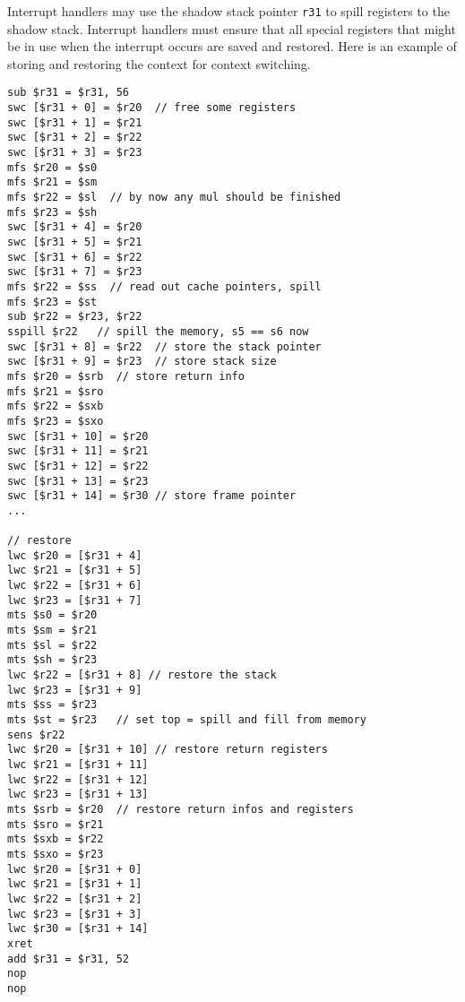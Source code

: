 Interrupt handlers may use the shadow stack pointer \texttt{r31} to spill registers
to the shadow stack. Interrupt handlers must ensure that all special registers
that might be in use when the interrupt occurs %
are saved and restored.
%
Here is an example of storing and restoring the context for context switching.
\begin{verbatim}
sub $r31 = $r31, 56
swc [$r31 + 0] = $r20  // free some registers
swc [$r31 + 1] = $r21
swc [$r31 + 2] = $r22
swc [$r31 + 3] = $r23
mfs $r20 = $s0
mfs $r21 = $sm
mfs $r22 = $sl  // by now any mul should be finished
mfs $r23 = $sh
swc [$r31 + 4] = $r20
swc [$r31 + 5] = $r21
swc [$r31 + 6] = $r22
swc [$r31 + 7] = $r23
mfs $r22 = $ss  // read out cache pointers, spill
mfs $r23 = $st
sub $r22 = $r23, $r22
sspill $r22   // spill the memory, s5 == s6 now
swc [$r31 + 8] = $r22  // store the stack pointer
swc [$r31 + 9] = $r23  // store stack size
mfs $r20 = $srb  // store return info
mfs $r21 = $sro
mfs $r22 = $sxb
mfs $r23 = $sxo
swc [$r31 + 10] = $r20
swc [$r31 + 11] = $r21
swc [$r31 + 12] = $r22
swc [$r31 + 13] = $r23
swc [$r31 + 14] = $r30 // store frame pointer
...

// restore
lwc $r20 = [$r31 + 4]
lwc $r21 = [$r31 + 5]
lwc $r22 = [$r31 + 6]
lwc $r23 = [$r31 + 7]
mts $s0 = $r20
mts $sm = $r21
mts $sl = $r22
mts $sh = $r23
lwc $r22 = [$r31 + 8] // restore the stack
lwc $r23 = [$r31 + 9]
mts $ss = $r23
mts $st = $r23   // set top = spill and fill from memory
sens $r22
lwc $r20 = [$r31 + 10] // restore return registers
lwc $r21 = [$r31 + 11]
lwc $r22 = [$r31 + 12]
lwc $r23 = [$r31 + 13]
mts $srb = $r20  // restore return infos and registers
mts $sro = $r21
mts $sxb = $r22
mts $sxo = $r23
lwc $r20 = [$r31 + 0]
lwc $r21 = [$r31 + 1]
lwc $r22 = [$r31 + 2]
lwc $r23 = [$r31 + 3]
lwc $r30 = [$r31 + 14]
xret
add $r31 = $r31, 52
nop
nop
\end{verbatim}


